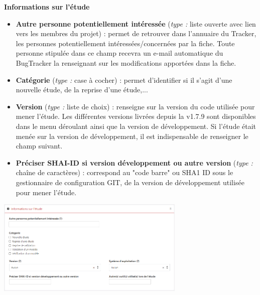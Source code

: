 \vspace{0.5cm}
\textbf{Informations sur l'étude}
\begin{itemize}[label=$\Rightarrow$, font=\LARGE]
   \item \textbf{Autre personne potentiellement intéressée} (\textit{type :} liste ouverte avec lien vers les membres du projet) : permet de retrouver dans l'annuaire du Tracker, les personnes potentiellement intéressées/concernées par la fiche. Toute personne stipulée dans ce champ recevra un e-mail automatique du BugTracker la renseignant sur les modifications apportées dans la fiche.
   \item \textbf{Catégorie} (\textit{type :} case à cocher) : permet d'identifier si il s'agit d'une nouvelle étude, de la reprise d'une étude,...
\end{itemize}

\begin{minipage}[c]{0.45\linewidth}
\begin{itemize}[label=$\Rightarrow$, font=\LARGE]
   \item \textbf{Version} (\textit{type :} liste de choix) : renseigne sur la version du code utilisée pour mener l'étude. Les différentes versions livrées depuis la v1.7.9 sont disponibles dans le menu déroulant ainsi que la version de développement. Si l'étude était menée sur la version de développement, il est indispensable de renseigner le champ suivant.
   \item \textbf{Préciser SHAI-ID si version développement ou autre version} (\textit{type :} chaîne de caractères) : correspond au "code barre" ou SHA1 ID sous le gestionnaire de configuration GIT, de la version de développement utilisée pour mener l'étude.
\end{itemize}

\end{minipage} \hfill
\begin{minipage}[c]{0.5\linewidth}
   \includegraphics[width=9cm]{pictures/GEA-info.png}\vspace*{0.2cm}

\end{minipage}

